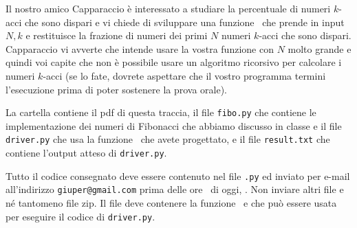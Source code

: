 \documentclass{amsart}
\begin{document}
Il nostro amico Capparaccio \`e interessato a studiare la percentuale di 
numeri $k$-acci che sono dispari e vi chiede di sviluppare una 
funzione \nomeMetodo\ che prende in input $N,k$ e restituisce la 
frazione di numeri dei primi $N$ numeri $k$-acci che sono dispari.
Capparaccio vi avverte che intende usare la vostra funzione con $N$ molto
grande e quindi voi capite che non \`e possibile usare un algoritmo
ricorsivo per calcolare i numeri $k$-acci (se lo fate, dovrete aspettare
che il vostro programma termini l'esecuzione prima di poter sostenere 
la prova orale).


\medskip{}
La cartella contiene il pdf di questa traccia, il file
{\tt fibo.py} che contiene le implementazione dei numeri di Fibonacci
che abbiamo discusso in classe e 
il file {\tt driver.py} che usa la funzione \nomeMetodo\ che avete
progettato, e il file  {\tt result.txt} che contiene
l'output atteso di {\tt driver.py}.

\medskip{}
Tutto il codice consegnato deve essere contenuto nel file
{\tt \nomeClasse .py} ed inviato per e-mail all'indirizzo
{\tt giuper@gmail.com} prima delle ore \oraconsegna\ di oggi, 
\dataoggi. Non inviare altri file e n\'e tantomeno file zip.
Il file deve contenere la funzione
\nomeMetodo\ e che pu\`o essere usata per eseguire
il codice di {\tt driver.py}. 
\end{document}
